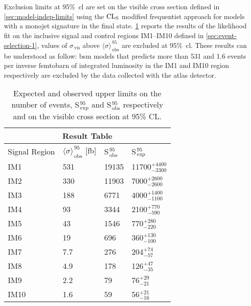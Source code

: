 Exclusion limits at 95\%~\gls{cl} are set on the visible cross section defined
in \ref{sec:model-indep-limits} using the $\mathrm{CL}_\mathrm{S}$ modified frequentist approach
for models with a monojet signature in the final
state. \cref{tab:cs_vis_results_2016} reports the results of the likelihood fit
on the inclusive signal and control regions IM1--IM10 defined in
\cref{sec:event-selection-1}, values of $\sigma_\mathrm{\, vis}$ above
$\langle \sigma \rangle_\mathrm{\, obs}^{\, 95}$ are excluded at
95\%~\gls{cl}. These results can be understood as follow: \gls{bsm} models that
predicts more than 531 and 1.6 events per inverse femtobarn of integrated
luminosity in the IM1 and IM10 region respectively are excluded by the data
collected with the \gls{atlas} detector.
\begin{table}[!h]
  \centering
  \begin{tabular}{llll}
    \toprule
    \multicolumn{4}{c}{Result Table} \\
    \midrule \midrule
    Signal Region & $\langle \sigma \rangle_\mathrm{\, obs}^{\, 95}$ [fb] & S$_\mathrm{\, obs}^{\, 95}$ & S$_\mathrm{\, exp}^{\, 95}$ \\
    \midrule
    IM1 & 531 & 19135 & 11700$^{+4400}_{-3300}$ \B \\
    IM2 & 330 & 11903 &  7000$^{+2600}_{-2600}$ \T \B \\
    IM3 & 188 & 6771  &  4000$^{+1400}_{-1100}$ \T \B \\
    IM4 & 93  & 3344  &  2100$^{+770}_{-590}$ \T \B \\
    IM5 & 43  & 1546  &   770$^{+280}_{-220}$ \T \B \\
    IM6 & 19  & 696   &   360$^{+130}_{-100}$ \T \B\\
    IM7 & 7.7 & 276   &   204$^{+74}_{-57}$ \T \\
    IM8 & 4.9 & 178   &   126$^{+47}_{-35}$ \T \\
    IM9 & 2.2 & 79    &    76$^{+29}_{-21}$ \T \\
    IM10& 1.6 & 59    &    56$^{+21}_{-16}$ \T \\
    \bottomrule
  \end{tabular}
  \caption{Expected and observed upper limits on the number of events,
    S$_\mathrm{\, exp}^{\, 95}$ and S$_\mathrm{\, obs}^{\, 95}$ respectively and
    on the visible cross section at 95\% CL.}
  \label{tab:cs_vis_results_2016}
\end{table}
